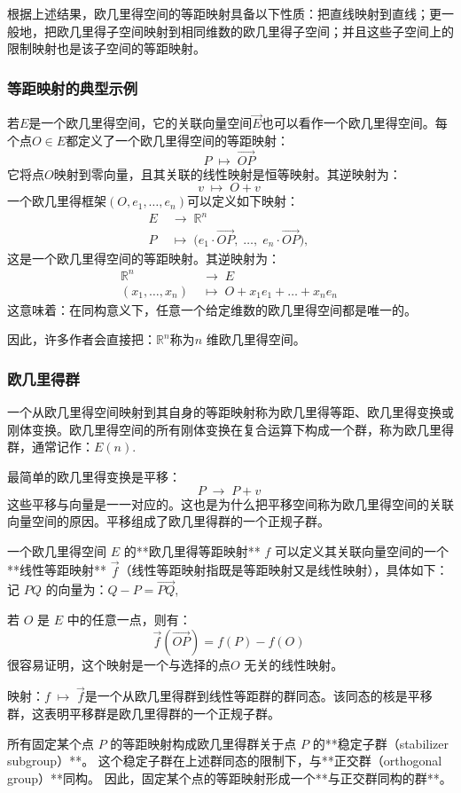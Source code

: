 根据上述结果，欧几里得空间的等距映射具备以下性质：把直线映射到直线；更一般地，把欧几里得子空间映射到相同维数的欧几里得子空间；并且这些子空间上的限制映射也是该子空间的等距映射。
\subsubsection{等距映射的典型示例}
若$E$是一个欧几里得空间，它的关联向量空间$\overrightarrow{E}$也可以看作一个欧几里得空间。每个点$O \in E$都定义了一个欧几里得空间的等距映射：
$$
P \;\mapsto\; \overrightarrow{OP}~
$$
它将点$O$映射到零向量，且其关联的线性映射是恒等映射。其逆映射为：
$$
v \;\mapsto\; O + v~
$$
一个欧几里得框架$(O, e_1, \dots, e_n)$可以定义如下映射：
$$
\begin{aligned}
E &\;\to\; \mathbb{R}^n \\
P &\;\mapsto\; 
\bigl( e_1 \cdot \overrightarrow{OP}, \; \dots, \; e_n \cdot \overrightarrow{OP} \bigr),
\end{aligned}~
$$
这是一个欧几里得空间的等距映射。其逆映射为：
$$
\begin{aligned}
\mathbb{R}^n &\;\to\; E \\
(x_1, \dots, x_n) &\;\mapsto\; 
O + x_1 e_1 + \dots + x_n e_n
\end{aligned}~
$$
这意味着：在同构意义下，任意一个给定维数的欧几里得空间都是唯一的。

因此，许多作者会直接把：$\mathbb{R}^n$称为$n$ 维欧几里得空间。
\subsubsection{欧几里得群}
一个从欧几里得空间映射到其自身的等距映射称为欧几里得等距、欧几里得变换或刚体变换。欧几里得空间的所有刚体变换在复合运算下构成一个群，称为欧几里得群，通常记作：$E(n)$.

最简单的欧几里得变换是平移：
$$
P \;\to\; P + v~
$$
这些平移与向量是一一对应的。这也是为什么把平移空间称为欧几里得空间的关联向量空间的原因。平移组成了欧几里得群的一个正规子群。

一个欧几里得空间 $E$ 的**欧几里得等距映射** $f$ 可以定义其关联向量空间的一个**线性等距映射** $\overrightarrow{f}$（线性等距映射指既是等距映射又是线性映射），具体如下：记 $P Q$ 的向量为：$Q - P = \overrightarrow{PQ}$,

若 $O$ 是 $E$ 中的任意一点，则有：
$$
\overrightarrow{f}(\overrightarrow{OP}) = f(P) - f(O)~
$$
很容易证明，这个映射是一个与选择的点$O$ 无关的线性映射。

映射：$f \;\longmapsto\; \overrightarrow{f}$是一个从欧几里得群到线性等距群的群同态。该同态的核是平移群，这表明平移群是欧几里得群的一个正规子群。

所有固定某个点 $P$ 的等距映射构成欧几里得群关于点 $P$ 的**稳定子群（stabilizer subgroup）**。
这个稳定子群在上述群同态的限制下，与**正交群（orthogonal group）**同构。
因此，固定某个点的等距映射形成一个**与正交群同构的群**。
